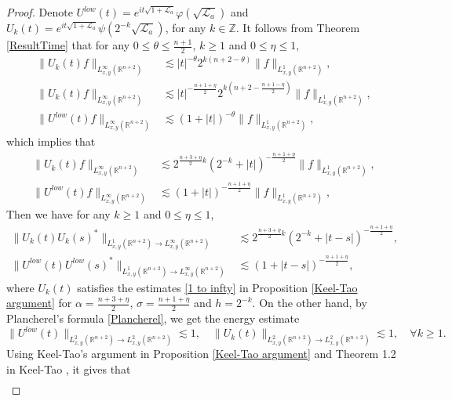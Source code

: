 \documentclass[a4paper,11pt, reqno]{amsart}
\numberwithin{equation}{section}
\theoremstyle{plain}
\theoremstyle{definition}
\theoremstyle{remark}
\begin{document}
\begin{proof} Denote $U^{low}(t)=e^{it\sqrt{1+\mathcal{L}_a}}\varphi(\sqrt{\mathcal{L}_a})$ and $U_k(t)=e^{it\sqrt{1+\mathcal{L}_a}}\psi(2^{-k}\sqrt{\mathcal{L}_a})$, for any $k\in\mathbb{Z}$.
It follows from Theorem \ref{ResultTime} that for any $0\leq \theta\leq \frac{n+1}{2}$, $k\geq1$ and $0\leq \eta\leq 1$,
\begin{align*}
\|U_k(t)f\|_{L^\infty_{x,y}(\mathbb{R}^{n+2})}&\lesssim |t|^{-\theta}2^{k(n+2-\theta)}\|f\|_{L^1_{x,y}(\mathbb{R}^{n+2})},\\
\|U_k(t)f\|_{L^\infty_{x,y}(\mathbb{R}^{n+2})}&\lesssim |t|^{-\frac{n+1+\eta}{2}}2^{k(n+2-\frac{n+1-\eta}{2})}\|f\|_{L^1_{x,y}(\mathbb{R}^{n+2})},\\
\|U^{low}(t)f\|_{L^\infty_{x,y}(\mathbb{R}^{n+2})}&\lesssim (1+|t|)^{-\theta}\|f\|_{L^1_{x,y}(\mathbb{R}^{n+2})},
\end{align*}
which implies that
\begin{align*}
\|U_k(t)f\|_{L^\infty_{x,y}(\mathbb{R}^{n+2})}&\lesssim 2^{\frac{n+3+\eta}{2}k}(2^{-k}+|t|)^{-\frac{n+1+\eta}{2}}\|f\|_{L^1_{x,y}(\mathbb{R}^{n+2})},\\
\|U^{low}(t)f\|_{L^\infty_{x,y}(\mathbb{R}^{n+2})}&\lesssim (1+|t|)^{-\frac{n+1+\eta}{2}}\|f\|_{L^1_{x,y}(\mathbb{R}^{n+2})},
\end{align*}
Then we have for any $k\geq1$ and $0\leq \eta\leq 1$,
\begin{align*}
\|U_k(t)U_k(s)^*\|_{L^1_{x,y}(\mathbb{R}^{n+2})\rightarrow L^\infty_{x,y}(\mathbb{R}^{n+2})}&\lesssim 2^{\frac{n+3+\eta}{2}k}(2^{-k}+|t-s|)^{-\frac{n+1+\eta}{2}},\\
\|U^{low}(t)U^{low}(s)^*\|_{L^1_{x,y}(\mathbb{R}^{n+2})\rightarrow L^\infty_{x,y}(\mathbb{R}^{n+2})}&\lesssim (1+|t-s|)^{-\frac{n+1+\eta}{2}},
\end{align*}
where $U_k(t)$ satisfies the estimates \eqref{1 to infty} in Proposition \ref{Keel-Tao argument} for $\alpha=\frac{n+3+\eta}{2}$, $\sigma=\frac{n+1+\eta}{2}$ and $h=2^{-k}$. 
On the other hand, by Plancherel's formula \eqref{Plancherel}, we get the energy estimate
\begin{equation*}
\|U^{low}(t)\|_{L^2_{x,y}(\mathbb{R}^{n+2})\rightarrow L^2_{x,y}(\mathbb{R}^{n+2})}\lesssim 1,\quad \|U_k(t)\|_{L^2_{x,y}(\mathbb{R}^{n+2})\rightarrow L^2_{x,y}(\mathbb{R}^{n+2})}\lesssim 1,\quad \forall k\geq1.
\end{equation*}
Using Keel-Tao's argument in Proposition \ref{Keel-Tao argument} and Theorem 1.2 in Keel-Tao \cite{KT}, it gives that
\begin{align*}

\end{align*}
\end{proof}
\end{document}
